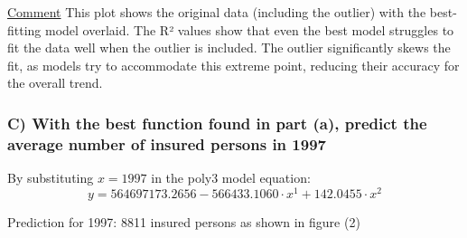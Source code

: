 \documentclass[12pt]{article}
\begin{document}
\uline{Comment}
This plot shows the original data (including the outlier) with the best-fitting model overlaid.
The R² values show that even the best model struggles to fit the data well when the outlier
is included. The outlier significantly skews the fit, as models try to accommodate this
extreme point, reducing their accuracy for the overall trend.

\subsubsection*{C) With the best function found in part (a), predict the average number of insured persons in 1997}
By substituting \( x = 1997 \) in the poly3 model equation:
\[
y = 564697173.2656 - 566433.1060 \cdot x^1 + 142.0455 \cdot x^2 
\]
\begin{adjustwidth}{0cm}{0cm}
Prediction for 1997: 8811 insured persons as shown in figure (2)\\
\end{adjustwidth}
\end{document}
